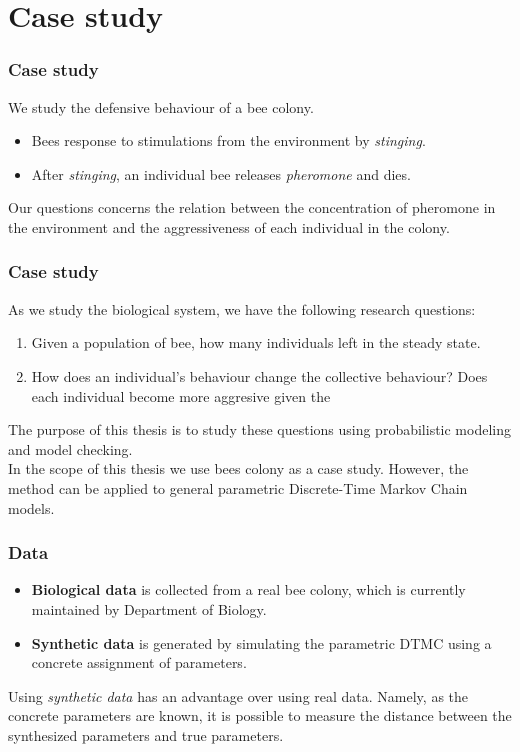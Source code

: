 \documentclass{beamer}
\begin{document}
\section{Case study}
\begin{frame}
  \frametitle{Case study}
  We study the defensive behaviour of a bee colony.
  \begin{itemize}
    \item Bees response to stimulations from the environment by \textit{stinging}.
    \item After \textit{stinging}, an individual bee releases \textit{pheromone}
          and dies.
  \end{itemize}
  Our questions concerns the relation between the concentration of pheromone in
  the environment and the aggressiveness of each individual in the colony.
\end{frame}

\begin{frame}
  \frametitle{Case study}
  As we study the biological system, we have the following research questions:
  \begin{enumerate}
    \item Given a population of bee, how many individuals left in the steady
          state.
    \item How does an individual's behaviour change the collective behaviour? Does
          each individual become more aggresive given the
  \end{enumerate}
  The purpose of this thesis is to study these questions using probabilistic
  modeling and model checking.\\
  In the scope of this thesis we use bees colony as a case study. However, the
  method can be applied to general parametric Discrete-Time Markov Chain models.
\end{frame}

\begin{frame}
  \frametitle{Data}
  \begin{itemize}
    \item \textbf{Biological data} is collected from a real bee colony, which is
          currently maintained by Department of Biology.
    \item \textbf{Synthetic data} is generated by simulating the parametric DTMC
          using a concrete assignment of parameters.
  \end{itemize}
  Using \textit{synthetic data} has an advantage over using real data. Namely,
  as the concrete parameters are known, it is possible to measure the distance
  between the synthesized parameters and true parameters.
\end{frame}
\end{document}
